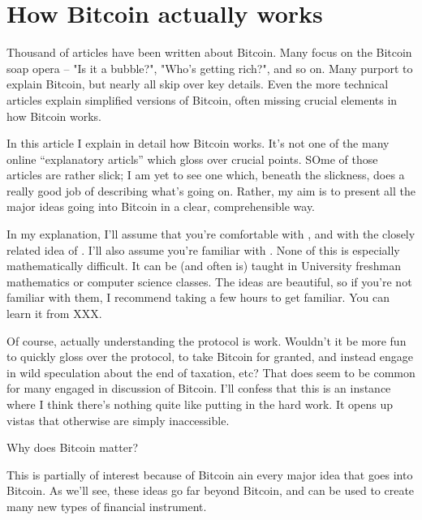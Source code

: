 \chapter{How Bitcoin actually works}

%
%
Thousand of articles have been written about Bitcoin.  Many focus on
the Bitcoin soap opera -- "Is it a bubble?", "Who's getting rich?",
and so on.  Many purport to explain Bitcoin, but nearly all skip over
key details.  Even the more technical articles explain simplified
versions of Bitcoin, often missing crucial elements in how Bitcoin
works.

%
%
In this article I explain in detail how Bitcoin works.  It's not one
of the many online ``explanatory articls'' which gloss over crucial
points.  SOme of those articles are rather slick; I am yet to see one
which, beneath the slickness, does a really good job of describing
what's going on.  Rather, my aim is to present all the major ideas
going into Bitcoin in a clear, comprehensible way.

%
%
In my explanation, I'll assume that you're comfortable with
, and with the closely related idea of
.  I'll also assume you're familiar with
.  None of this is especially mathematically
difficult.  It can be (and often is) taught in University freshman
mathematics or computer science classes.  The ideas are beautiful, so
if you're not familiar with them, I recommend taking a few hours to
get familiar.  You can learn it from XXX.

%
%
Of course, actually understanding the protocol is work.  Wouldn't it
be more fun to quickly gloss over the protocol, to take Bitcoin for
granted, and instead engage in wild speculation about the end of
taxation, etc?  That does seem to be common for many engaged in
discussion of Bitcoin.  I'll confess that this is an instance where I
think there's nothing quite like putting in the hard work.  It opens
up vistas that otherwise are simply inaccessible.

%
%
Why does Bitcoin matter?

This is
partially of interest because of Bitcoin ain every major idea that
goes into Bitcoin.  As we'll see, these ideas go far beyond Bitcoin,
and can be used to create many new types of financial instrument.


